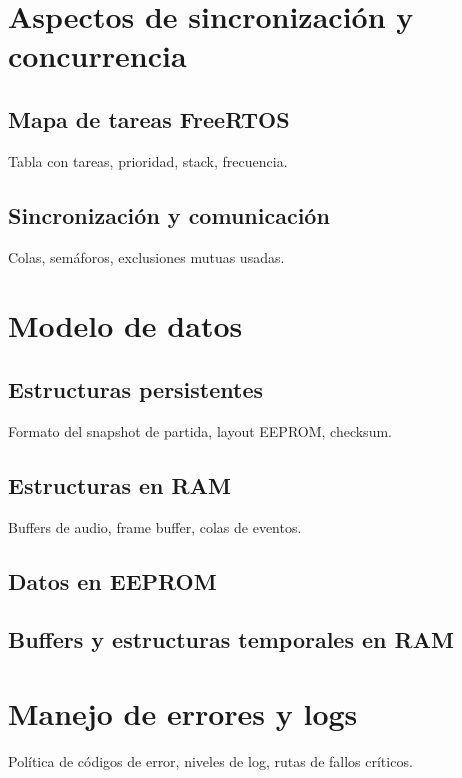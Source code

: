 \documentclass[11pt,a4paper]{article}
\begin{document}
\section{Aspectos de sincronización y concurrencia}
\subsection{Mapa de tareas FreeRTOS}
Tabla con tareas, prioridad, stack, frecuencia.

\subsection{Sincronización y comunicación}
Colas, semáforos, exclusiones mutuas usadas.


\section{Modelo de datos}
\subsection{Estructuras persistentes}
Formato del snapshot de partida, layout EEPROM, checksum.

\subsection{Estructuras en RAM}
Buffers de audio, frame buffer, colas de eventos.
\subsection{Datos en EEPROM}
\subsection{Buffers y estructuras temporales en RAM}

\section{Manejo de errores y logs}
Política de códigos de error, niveles de log, rutas de fallos críticos.
\end{document}
